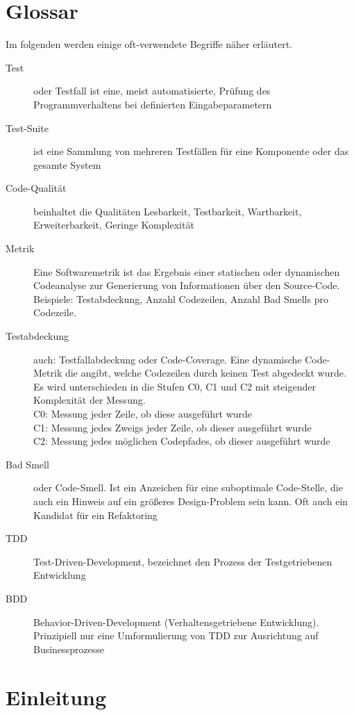 \section*{Glossar}
Im folgenden werden einige oft-verwendete Begriffe näher erläutert.
\begin{description}
 \item[Test] oder Testfall ist eine, meist automatisierte, Prüfung des Programmverhaltens bei definierten Eingabeparametern
 \item[Test-Suite] ist eine Sammlung von mehreren Testfällen für eine Komponente oder das gesamte System
 \item[Code-Qualität] beinhaltet die Qualitäten Lesbarkeit, Testbarkeit, Wartbarkeit, Erweiterbarkeit, Geringe Komplexität
 \item[Metrik] Eine Softwaremetrik ist das Ergebnis einer statischen oder dynamischen Codeanalyse zur Generierung von Informationen über den Source-Code. Beispiele: Testabdeckung, Anzahl Codezeilen, Anzahl Bad Smells pro Codezeile.
 
 \item[Testabdeckung] auch: Testfallabdeckung oder Code-Coverage. Eine dynamische Code-Metrik die angibt, welche Codezeilen durch keinen Test abgedeckt wurde. Es wird unterschieden in die Stufen C0, C1 und C2 mit steigender Komplexität der Messung.\\
 C0: Messung jeder Zeile, ob diese ausgeführt wurde\\
 C1: Messung jedes Zweigs jeder Zeile, ob dieser ausgeführt wurde\\
 C2: Messung jedes möglichen Codepfades, ob dieser ausgeführt wurde
 \item[Bad Smell] oder Code-Smell. Ist ein Anzeichen für eine suboptimale Code-Stelle, die auch ein Hinweis auf ein größeres Design-Problem sein kann. Oft auch ein Kandidat für ein Refaktoring
 \item[TDD] Test-Driven-Development, bezeichnet den Prozess der Testgetriebenen Entwicklung
 \item[BDD] Behavior-Driven-Development (Verhaltensgetriebene Entwicklung). Prinzipiell nur eine Umformulierung von TDD zur Ausrichtung auf Businessprozesse
\end{description}

\section{Einleitung}
